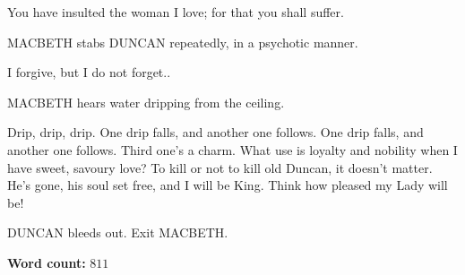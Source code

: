 \documentclass{article}
\begin{document}
\macbeth You have insulted the woman I love; for that you shall suffer.

\begin{dida}
MACBETH stabs DUNCAN repeatedly, in a psychotic manner.
\end{dida}

\duncan {} I forgive, but I do not forget..

\begin{dida}
MACBETH hears water dripping from the ceiling.
\end{dida}

\macbeth {} Drip, drip, drip. One drip falls, and another one follows. One drip falls, and another one follows. Third one's a charm. What use is loyalty and nobility when I have sweet, savoury love? To kill or not to kill old Duncan, it doesn't matter. He's gone, his soul set free, and I will be King. Think how pleased my Lady will be!

\begin{dida}
DUNCAN bleeds out. Exit MACBETH.
\end{dida}

\textbf{Word count:} $811$
\end{document}
